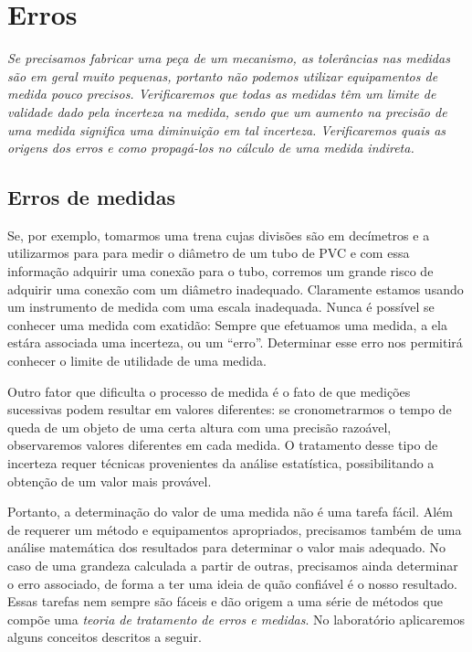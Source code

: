 \chapter{Erros}
\label{Chap:Erros}

\begin{fullwidth}
{\it
Se precisamos fabricar uma peça de um mecanismo, as tolerâncias nas medidas são em geral muito pequenas, portanto não podemos utilizar equipamentos de medida pouco precisos. Verificaremos que todas as medidas têm um limite de validade dado pela incerteza na medida, sendo que um aumento na precisão de uma medida significa uma diminuição em tal incerteza. Verificaremos quais as origens dos erros e como propagá-los no cálculo de uma medida indireta.
}
\end{fullwidth}

\section{Erros de medidas}

Se, por exemplo, tomarmos uma trena cujas divisões são em decímetros e a utilizarmos para para medir o diâmetro de um tubo de PVC e com essa informação adquirir uma conexão para o tubo, corremos um grande risco de adquirir uma conexão com um diâmetro inadequado. Claramente estamos usando um instrumento de medida com uma escala inadequada. Nunca é possível se conhecer uma medida com exatidão: Sempre que efetuamos uma medida, a ela estára associada uma incerteza, ou um ``erro''. Determinar esse erro nos permitirá conhecer o limite de utilidade de uma medida. 

Outro fator que dificulta o processo de medida é o fato de que medições sucessivas podem resultar em valores diferentes: se cronometrarmos o tempo de queda de um objeto de uma certa altura com uma precisão razoável, observaremos valores diferentes em cada medida. O tratamento desse tipo de incerteza requer técnicas provenientes da análise estatística, possibilitando a obtenção de um valor mais provável.

Portanto, a determinação do valor de uma medida não é uma tarefa fácil. Além de requerer um método e equipamentos apropriados, precisamos também de uma análise matemática dos resultados para determinar o valor mais adequado. No caso de uma grandeza calculada a partir de outras, precisamos ainda determinar o erro associado, de forma a ter uma ideia de quão confiável é o nosso resultado. Essas tarefas nem sempre são fáceis e dão origem a uma série de métodos que compõe uma \emph{teoria de tratamento de erros e medidas}. No laboratório aplicaremos alguns conceitos descritos a seguir.

